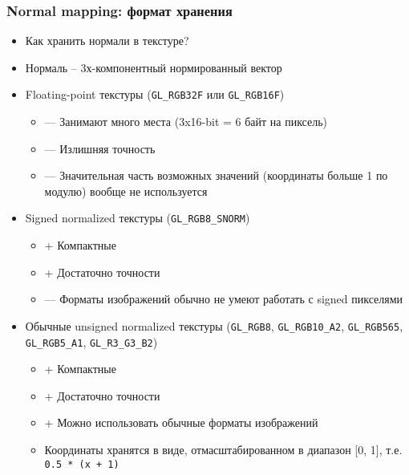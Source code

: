 \documentclass{beamer}
\begin{document}
\begin{frame}[fragile]
\frametitle{Normal mapping: формат хранения}
\fontsize{10pt}{10pt}
\begin{itemize}
\item Как хранить нормали в текстуре?
\pause
\item Нормаль -- 3х-компонентный нормированный вектор
\pause
\item Floating-point текстуры (\verb|GL_RGB32F| или \verb|GL_RGB16F|)
\begin{itemize}
\item {\color{red}—} Занимают много места (3x16-bit = 6 байт на пиксель)
\item {\color{red}—} Излишняя точность
\item {\color{red}—} Значительная часть возможных значений (координаты больше 1 по модулю) вообще не используется
\end{itemize}
\pause
\item Signed normalized текстуры (\verb|GL_RGB8_SNORM|)
\begin{itemize}
\item {\color{green}+} Компактные
\item {\color{green}+} Достаточно точности
\item {\color{red}—} Форматы изображений обычно не умеют работать с signed пикселями
\end{itemize}
\pause
\item Обычные unsigned normalized текстуры (\verb|GL_RGB8|, \verb|GL_RGB10_A2|, \verb|GL_RGB565|, \verb|GL_RGB5_A1|, \verb|GL_R3_G3_B2|)
\begin{itemize}
\item {\color{green}+} Компактные
\item {\color{green}+} Достаточно точности
\item {\color{green}+} Можно использовать обычные форматы изображений
\item Координаты хранятся в виде, отмасштабированном в диапазон [0, 1], т.е. \verb|0.5 * (x + 1)|
\end{itemize}
\end{itemize}
\end{frame}
\end{document}

